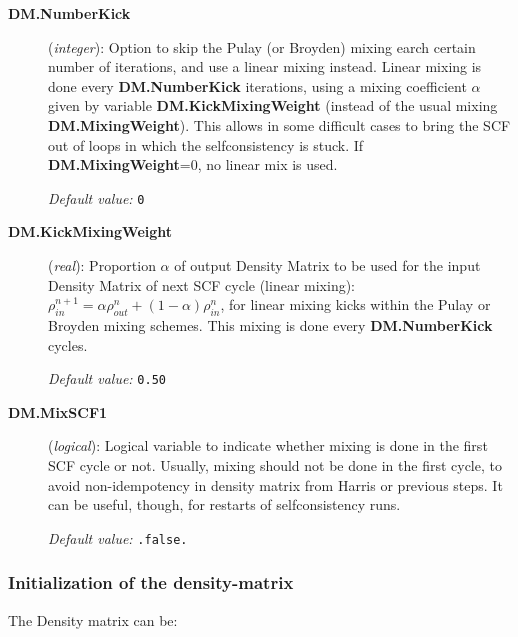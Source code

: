 \documentclass[11pt]{article}
\begin{document}
\begin{description}
\item[{\bf DM.NumberKick}] ({\it integer}): 
Option to skip the Pulay (or Broyden) mixing earch certain number of iterations,
and use a linear mixing instead. Linear mixing is done
every {\bf DM.NumberKick} iterations, using a mixing coefficient
$\alpha$ given by variable {\bf DM.KickMixingWeight} 
(instead of the usual mixing {\bf DM.MixingWeight}).
This allows in some difficult cases to bring the SCF out of
loops in which the selfconsistency is stuck.
If {\bf DM.MixingWeight}=0, no linear mix is used.

{\it Default value:} {\tt 0}

\item[{\bf DM.KickMixingWeight}] ({\it real}):
Proportion $\alpha$ of 
output Density Matrix to be used for the input Density Matrix of 
next SCF cycle (linear mixing):
$\rho^{n+1}_{in} = \alpha \rho^{n}_{out} 
+(1 - \alpha) \rho^{n}_{in}$, for linear mixing kicks within the
Pulay or Broyden mixing schemes. 
This mixing is done every {\bf DM.NumberKick} cycles.

{\it Default value:} {\tt 0.50}


\item[{\bf DM.MixSCF1}] ({\it logical}):
Logical variable to indicate whether mixing is done in the
first SCF cycle or not. Usually, mixing should not be done in
the first cycle, to avoid non-idempotency in density matrix
from Harris or previous steps. It can be useful, though,
for restarts of selfconsistency runs.

{\it Default value:} {\tt .false.}

\end{description}

\subsubsection{Initialization of the density-matrix}

The Density matrix can be:
\end{document}
